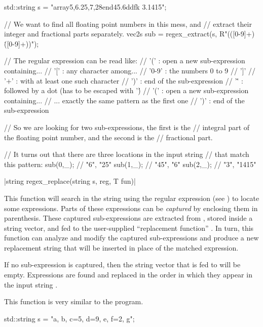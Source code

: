 {\begin{example}
\begin{cppcode}
std::string s = "array{5,6.25,7,28}end45.6ddfk 3.1415";

// We want to find all floating point numbers in this mess, and
// extract their integer and fractional parts separately.
vec2s sub = regex_extract(s, R"(([0-9]+)\.([0-9]+))");

// The regular expression can be read like:
// '('   : open a new sub-expression containing...
// '['   : any character among...
// '0-9' : the numbers 0 to 9
// ']'
// '+'   : with at least one such character
// ')'   : end of the sub-expression
// '\.'  : followed by a dot (has to be escaped with '\')
// '('   : open a new sub-expression containing...
//         ... exactly the same pattern as the first one
// ')'   : end of the sub-expression

// So we are looking for two sub-expressions, the first is the
// integral part of the floating point number, and the second is the
// fractional part.

// It turns out that there are three locations in the input string
// that match this pattern:
sub(0,_); // {"6",  "25"}
sub(1,_); // {"45", "6"}
sub(2,_); // {"3",  "1415"}
\end{cppcode}
\end{example}

\funcitem \cppinline|string regex_replace(string s, reg, T fun)| 

This function will search in the string  using the regular expression  (see ) to locate some expressions. Parts of these expressions can be \emph{captured} by enclosing them in parenthesis. These captured sub-expressions are extracted from , stored inside a string vector, and fed to the user-supplied ``replacement function'' . In turn, this function can analyze and modify the captured sub-expressions and produce a new replacement string that will be inserted in place of the matched expression.

If no sub-expression is captured, then the string vector that is fed to  will be empty. Expressions are found and replaced in the order in which they appear in the input string .

This function is very similar to the  program.

\begin{example}
\begin{cppcode}
std::string s = "a, b, c=5, d=9, e, f=2, g";


\end{cppcode}
\end{example}}
